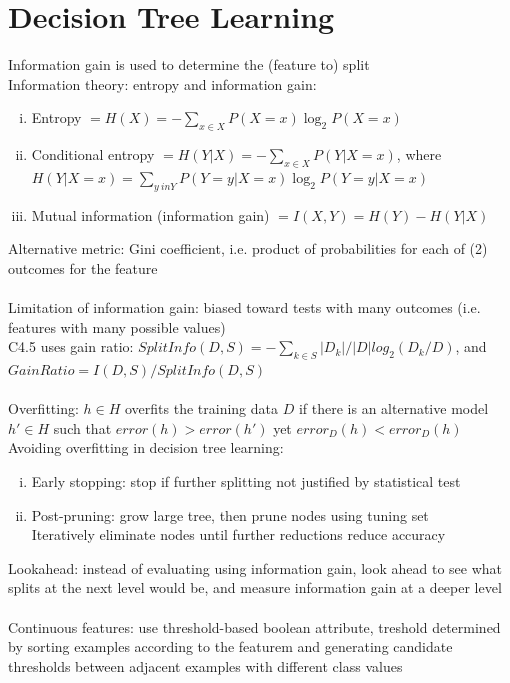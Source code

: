 \documentclass{article}
\begin{document}
	\section{Decision Tree Learning}
		Information gain is used to determine the (feature to) split \\
		Information theory: entropy and information gain:
		\begin{enumerate}[(i)]
			\item Entropy $= H(X) = -\sum_{x \in X}P(X = x)\log_2 P(X = x)$
			\item Conditional entropy $= H(Y|X) = -\sum_{x \in X}P(Y|X = x)$, where \\
			$H(Y|X = x) = \sum_{y \ in Y}P(Y = y|X = x)\log_2 P(Y = y|X = x)$
			\item Mutual information (information gain) $= I(X, Y) = H(Y) - H(Y|X)$
			\end{enumerate}
		Alternative metric: Gini coefficient, i.e. product of probabilities for each of (2) outcomes for the feature \\
		\\
		Limitation of information gain: biased toward tests with many outcomes (i.e. features with many possible values) \\
		C4.5 uses gain ratio: $SplitInfo(D, S) = -\sum_{k \in S} |D_k|/|D| log_2(D_k/D)$, and $GainRatio = I(D, S)/SplitInfo(D, S)$ \\
		\\
		Overfitting: $h \in H$ overfits the training data $D$ if there is an alternative model $h' \in H$ such that $error(h) > error(h')$ yet $error_D(h) < error_D(h)$ \\
		Avoiding overfitting in decision tree learning:
		\begin{enumerate}[(i)]
			\item Early stopping: stop if further splitting not justified by statistical test
			\item Post-pruning: grow large tree, then prune nodes using tuning set \\
			Iteratively eliminate nodes until further reductions reduce accuracy
			\end{enumerate}
		Lookahead: instead of evaluating using information gain, look ahead to see what splits at the next level would be, and measure information gain at a deeper level \\
		\\
		Continuous features: use threshold-based boolean attribute, treshold determined by sorting examples according to the featurem and generating candidate thresholds between adjacent examples with different class values \\
\end{document}
